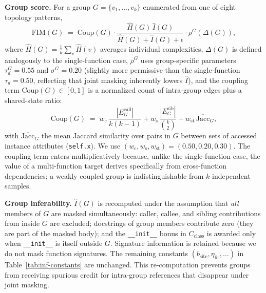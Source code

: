 \textbf{Group score.}
For a group $G = \{v_1, \dots, v_k\}$ enumerated from one of eight
topology patterns,
\begin{equation}
  \mathrm{FIM}(G) \;=\;
  \mathrm{Coup}(G)
  \cdot
  \frac{\hat{H}(G)\,\hat{I}(G)}{\hat{H}(G) + \hat{I}(G) + \epsilon}
  \cdot
  \rho^G\!\left(\Delta(G)\right),
  \label{eq:fim_group}
\end{equation}
where $\hat{H}(G)=\tfrac{1}{k}\sum_v \hat{H}(v)$ averages individual
complexities, $\Delta(G)$ is defined analogously to the single-function
case, $\rho^G$ uses group-specific parameters $\tau_d^G=0.55$ and
$\sigma^G=0.20$ (slightly more permissive than the single-function
$\tau_d=0.50$, reflecting that joint masking inherently lowers $\hat{I}$),
and the coupling term $\mathrm{Coup}(G)\in[0,1]$ is a normalized count
of intra-group edges plus a shared-state ratio:
\begin{equation}
  \mathrm{Coup}(G)
  \;=\; w_{\mathrm{c}}\,\frac{|E^{\text{call}}_G|}{k(k\!-\!1)}
   + w_{\mathrm{s}}\,\frac{|E^{\text{sib}}_G|}{\binom{k}{2}}
   + w_{\mathrm{st}}\,\overline{\mathrm{Jacc}}_G,
  \label{eq:coupling}
\end{equation}
with $\overline{\mathrm{Jacc}}_G$ the mean Jaccard similarity over pairs
in $G$ between sets of accessed instance attributes (\texttt{self.x}).
We use $(w_{\mathrm{c}}, w_{\mathrm{s}}, w_{\mathrm{st}}) = (0.50,
0.20, 0.30)$. The coupling term enters multiplicatively because, unlike
the single-function case, the value of a multi-function target derives
specifically from cross-function dependencies; a weakly coupled group
is indistinguishable from $k$ independent samples.

\textbf{Group inferability.}
$\hat{I}(G)$ is recomputed under the assumption that \emph{all} members
of $G$ are masked simultaneously: caller, callee, and sibling
contributions from inside $G$ are excluded; docstrings of group members
contribute zero (they are part of the masked body); and the
\texttt{\_\_init\_\_} bonus in $C_{\mathrm{class}}$ is awarded only when
\texttt{\_\_init\_\_} is itself outside $G$. Signature information is
retained because we do not mask function signatures. The remaining
constants $(b_{\mathrm{site}}, \eta_{\mathrm{lit}}, \dots)$ in
Table~\ref{tab:inf-constants} are unchanged. This re-computation
prevents groups from receiving spurious credit for intra-group
references that disappear under joint masking.

